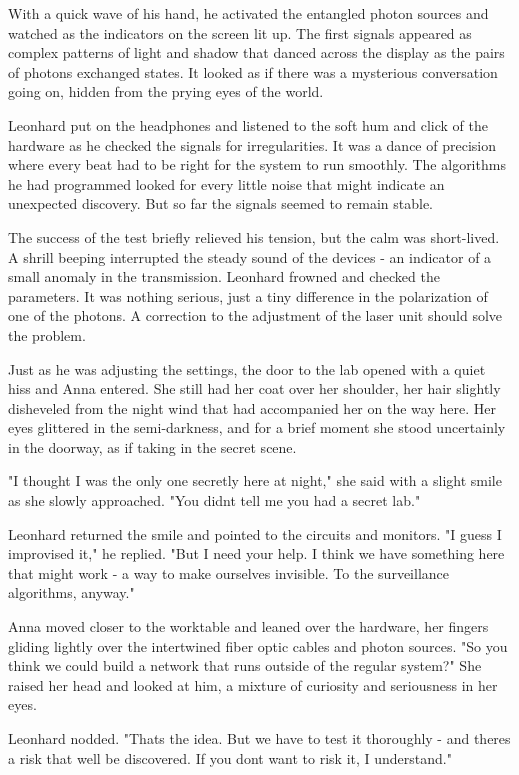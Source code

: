 \documentclass[
]{article}
\begin{document}
With a quick wave of his hand, he activated the entangled photon sources
and watched as the indicators on the screen lit up. The first signals
appeared as complex patterns of light and shadow that danced across the
display as the pairs of photons exchanged states. It looked as if there
was a mysterious conversation going on, hidden from the prying eyes of
the world.

Leonhard put on the headphones and listened to the soft hum and click of
the hardware as he checked the signals for irregularities. It was a
dance of precision where every beat had to be right for the system to
run smoothly. The algorithms he had programmed looked for every little
noise that might indicate an unexpected discovery. But so far the
signals seemed to remain stable.

The success of the test briefly relieved his tension, but the calm was
short-lived. A shrill beeping interrupted the steady sound of the
devices - an indicator of a small anomaly in the transmission. Leonhard
frowned and checked the parameters. It was nothing serious, just a tiny
difference in the polarization of one of the photons. A correction to
the adjustment of the laser unit should solve the problem.

Just as he was adjusting the settings, the door to the lab opened with a
quiet hiss and Anna entered. She still had her coat over her shoulder,
her hair slightly disheveled from the night wind that had accompanied
her on the way here. Her eyes glittered in the semi-darkness, and for a
brief moment she stood uncertainly in the doorway, as if taking in the
secret scene.

"I thought I was the only one secretly here at night," she said with a
slight smile as she slowly approached. "You didn\textquotesingle t tell
me you had a secret lab."

Leonhard returned the smile and pointed to the circuits and monitors. "I
guess I improvised it," he replied. "But I need your help. I think we
have something here that might work - a way to make ourselves invisible.
To the surveillance algorithms, anyway."

Anna moved closer to the worktable and leaned over the hardware, her
fingers gliding lightly over the intertwined fiber optic cables and
photon sources. "So you think we could build a network that runs outside
of the regular system?" She raised her head and looked at him, a mixture
of curiosity and seriousness in her eyes.

Leonhard nodded. "That\textquotesingle s the idea. But we have to test
it thoroughly - and there\textquotesingle s a risk that
we\textquotesingle ll be discovered. If you don\textquotesingle t want
to risk it, I understand."
\end{document}
